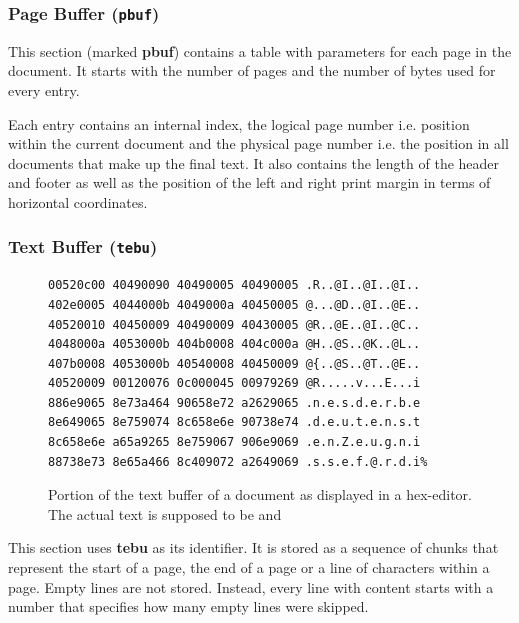 \subsubsection{Page Buffer (\texttt{pbuf})}
\label{sec:sdoc_pbuf}

This section (marked \textbf{pbuf}) contains a table with parameters for each page in the document. It starts with the number of pages and the number of \glspl{byte} used for every entry.

Each entry contains an internal index, the logical page number i.e. position within the current document and the physical page number i.e. the position in all documents that make up the final text. It also contains the length of the header and footer as well as the position of the left and right print margin in terms of horizontal coordinates.

\subsubsection{Text Buffer (\texttt{tebu})}
\label{sec:sdoc_tebu}

\begin{figure}[ht]
    \centering
    \begin{Verbatim}[fontsize=\small]
00520c00 40490090 40490005 40490005 .R..@I..@I..@I..
402e0005 4044000b 4049000a 40450005 @...@D..@I..@E..
40520010 40450009 40490009 40430005 @R..@E..@I..@C..
4048000a 4053000b 404b0008 404c000a @H..@S..@K..@L..
407b0008 4053000b 40540008 40450009 @{..@S..@T..@E..
40520009 00120076 0c000045 00979269 @R.....v...E...i
886e9065 8e73a464 90658e72 a2629065 .n.e.s.d.e.r.b.e
8e649065 8e759074 8c658e6e 90738e74 .d.e.u.t.e.n.s.t
8c658e6e a65a9265 8e759067 906e9069 .e.n.Z.e.u.g.n.i
88738e73 8e65a466 8c409072 a2649069 .s.s.e.f.@.r.d.i%
\end{Verbatim}
    \caption{Portion of the text buffer of a document as displayed in a hex-editor. The actual text is supposed to be  and  \label{fig:sdo-hexdump}}
\end{figure}

This section uses \textbf{tebu} as its identifier. It is stored as a sequence of chunks that represent the start of a page, the end of a page or a line of characters within a page. Empty lines are not stored. Instead, every line with content starts with a number that specifies how many empty lines were skipped.

